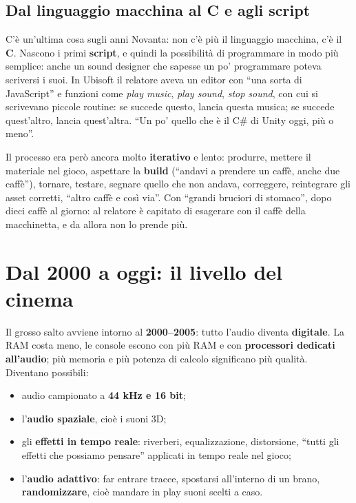 \subsection{Dal linguaggio macchina al C e agli script}

C'è un'ultima cosa sugli anni Novanta: non c'è più il linguaggio macchina, c'è il
\textbf{C}. Nascono i primi \textbf{script}, e quindi la possibilità di
programmare in modo più semplice: anche un sound designer che sapesse un po'
programmare poteva scriversi i suoi. In Ubisoft il relatore aveva un editor con
``una sorta di JavaScript'' e funzioni come \emph{play music}, \emph{play sound},
\emph{stop sound}, con cui si scrivevano piccole routine: se succede questo,
lancia questa musica; se succede quest'altro, lancia quest'altra. ``Un po' quello
che è il C\# di Unity oggi, più o meno''.

Il processo era però ancora molto \textbf{iterativo} e lento: produrre, mettere
il materiale nel gioco, aspettare la \textbf{build} (``andavi a prendere un
caffè, anche due caffè''), tornare, testare, segnare quello che non andava,
correggere, reintegrare gli asset corretti, ``altro caffè e così via''. Con
``grandi bruciori di stomaco'', dopo dieci caffè al giorno: al relatore è capitato
di esagerare con il caffè della macchinetta, e da allora non lo prende più.

\section{Dal 2000 a oggi: il livello del cinema}
\label{z9:sec:presente}

Il grosso salto avviene intorno al \textbf{2000--2005}: tutto l'audio diventa
\textbf{digitale}. La RAM costa meno, le console escono con più RAM e con
\textbf{processori dedicati all'audio}; più memoria e più potenza di calcolo
significano più qualità. Diventano possibili:
\begin{itemize}
  \item audio campionato a \textbf{44 kHz e 16 bit};
  \item l'\textbf{audio spaziale}, cioè i suoni 3D;
  \item gli \textbf{effetti in tempo reale}: riverberi, equalizzazione,
        distorsione, ``tutti gli effetti che possiamo pensare'' applicati in
        tempo reale nel gioco;
  \item l'\textbf{audio adattivo}: far entrare tracce, spostarsi all'interno di
        un brano, \textbf{randomizzare}, cioè mandare in play suoni scelti a
        caso.
\end{itemize}

